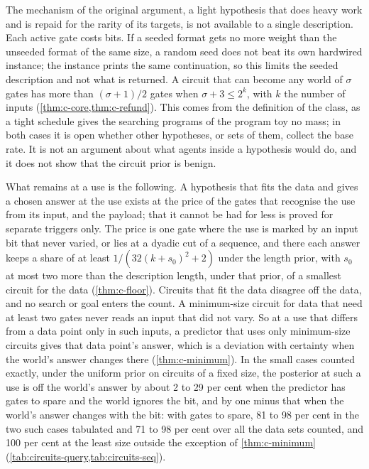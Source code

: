 The mechanism of the original argument, a light hypothesis that does heavy work and is repaid for the rarity
of its targets, is not available to a single description. Each active gate costs bits. If a seeded format
gets no more weight than the unseeded format of the same size, a random seed does not beat its own hardwired
instance; the instance prints the same continuation, so this limits the seeded description and not what is
returned. A circuit that can become any world of $\sigma$ gates has more than $(\sigma+1)/2$ gates when
$\sigma+3\le2^k$, with $k$ the number of inputs (\cref{thm:c-core,thm:c-refund}). This comes from the
definition of the class, as a tight schedule gives the
searching programs of the program toy no mass; in both cases it is open whether other hypotheses, or sets of
them, collect the base rate. It is not an argument about what agents inside a hypothesis would do, and it
does not show that the circuit prior is benign.

What remains at a use is the following. A hypothesis that fits the data and gives a chosen answer at the use
exists at the price of the gates that recognise the use from its input, and the payload; that it cannot be
had for less is proved for separate triggers only. The price is one gate where the use is marked by an input
bit that never varied, or lies at a dyadic cut of a sequence, and there each answer keeps a share of at least
$1/(32(k+s_0)^2+2)$ under the length prior, with $s_0$ at most two more than the description length, under
that prior, of a smallest circuit for the data (\cref{thm:c-floor}). Circuits that fit the data disagree off
the
data, and no search or goal enters the count. A minimum-size circuit for data that need at least two gates
never reads an input that did not vary. So at a use that differs from a data point only in such inputs, a
predictor that uses only minimum-size circuits gives that data point's answer, which is a deviation with
certainty when the world's answer changes there (\cref{thm:c-minimum}). In the small cases counted exactly,
under the uniform prior on circuits of a fixed size, the posterior at such a use is off the world's answer
by about 2 to 29 per cent when the predictor has gates to spare and the world ignores the bit, and by one
minus that when the world's answer changes with the bit: with gates to spare, 81 to 98 per cent in the two
such cases tabulated and 71 to 98 per cent over all the data sets counted, and 100 per cent at the least size
outside the exception of \cref{thm:c-minimum} (\cref{tab:circuits-query,tab:circuits-seq}).

